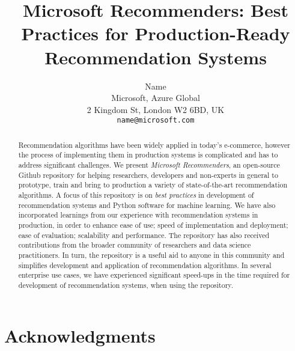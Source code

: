 \documentclass{article}
\title{Microsoft Recommenders: Best Practices for Production-Ready Recommendation Systems}
\author{%
  Name \\
  Microsoft, Azure Global \\
  2 Kingdom St, London W2 6BD, UK \\
  \texttt{name@microsoft.com} \\
}
\begin{document}
\maketitle

\begin{abstract}
Recommendation algorithms have been widely applied in today's e-commerce, however the process of implementing them in production 
systems is complicated and has to address significant challenges. We present {\em Microsoft Recommenders},  
an open-source Github repository for helping researchers, developers and non-experts in general to prototype, train and
bring to production a variety of state-of-the-art recommendation algorithms.
A focus of this repository is on {\em best practices} in development of recommendation systems and Python software for machine learning.
We have also incorporated learnings from our experience with recommendation systems in production, in order to enhance ease of use; speed of 
implementation and deployment; ease of evaluation; scalability and performance. 
The repository has also received contributions from the broader community of researchers and data science practitioners. 
In turn, the repository is a useful aid to anyone in this community and simplifies development and application of recommendation algorithms.
In several enterprise use cases, we have experienced significant speed-ups in the time required for development of recommendation systems, 
when using the repository.
\end{abstract}






 














\section*{Acknowledgments}


\end{document}
